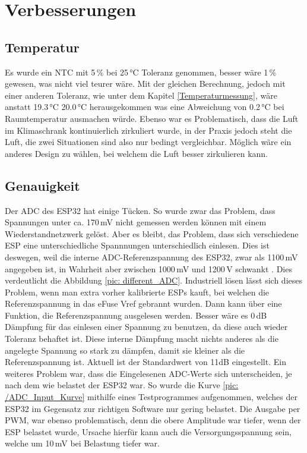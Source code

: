 \section{Verbesserungen} 
\label{Verbesserungen}

\subsection{Temperatur}
Es wurde ein NTC mit 5\,\% bei 25\,°C Toleranz genommen, besser wäre 1\,\% gewesen, was nicht viel teurer wäre. Mit der gleichen Berechnung, jedoch mit einer anderen Toleranz, wie unter dem Kapitel \ref{Temperaturmessung}, wäre anstatt 19.3\,°C 20.0\,°C herausgekommen was eine Abweichung von 0.2\,°C bei Raumtemperatur ausmachen würde. Ebenso war es Problematisch, dass die Luft im Klimaschrank kontinuierlich zirkuliert wurde, in der Praxis jedoch steht die Luft, die zwei Situationen sind also nur bedingt vergleichbar. Möglich wäre ein anderes Design zu wählen, bei welchem die Luft besser zirkulieren kann.

\subsection{Genauigkeit}
Der ADC des ESP32 hat einige Tücken. So wurde zwar das Problem, dass Spannungen unter ca. 170\,mV nicht gemessen werden können mit einem Wiederstandnetzwerk gelöst. Aber es bleibt, das Problem, dass sich verschiedene ESP eine unterschiedliche Spannnungen unterschiedlich einlesen. Dies ist deswegen, weil die interne ADC-Referenzspannung des ESP32, zwar als 1100\,mV angegeben ist, in Wahrheit aber zwischen 1000\,mV und 1200\,V schwankt \cite{noauthor_analog_nodate}. Dies verdeutlicht die Abbildung \ref{pic: different_ADC}. Industriell lösen lässt sich dieses Problem, wenn man extra vorher kalibrierte ESPs kauft, bei welchen die Referenzspannung in das eFuse Vref gebrannt wurden. Dann kann über eine Funktion, die Referenzspannung ausgelesen werden. Besser wäre es 0\,dB Dämpfung für das einlesen einer Spannung zu benutzen, da diese auch wieder Toleranz behaftet ist. Diese interne Dämpfung macht nichts anderes als die angelegte Spannung so stark zu dämpfen, damit sie kleiner als die Referenzspannung ist. Aktuell ist der Standardwert von 11dB eingestellt. Ein weiteres Problem war, dass die Eingelesenen ADC-Werte sich unterscheiden, je nach dem wie belastet der ESP32 war. So wurde die Kurve \ref{pic: /ADC_Input_Kurve} mithilfe eines Testprogrammes aufgenommen, welches der ESP32 im Gegensatz zur richtigen Software nur gering belastet. Die Ausgabe per PWM, war ebenso problematisch, denn die obere Amplitude war tiefer, wenn der ESP belastet wurde, Ursache hierfür kann auch die Versorgungsspannung sein, welche um 10\,mV bei Belastung tiefer war.

